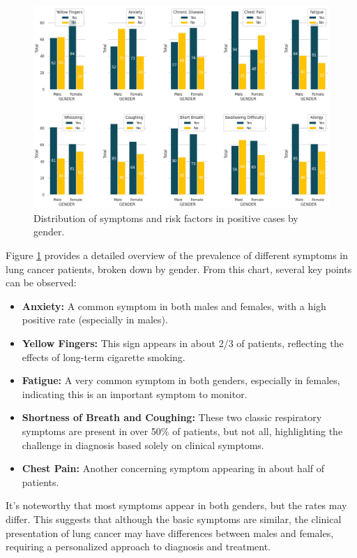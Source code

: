 \begin{figure}[H]
    \centering
    \includegraphics[width=\textwidth]{Images/symptoms.png}
    \caption{Distribution of symptoms and risk factors in positive cases by gender.}
    \label{fig:symptoms_dist}
\end{figure}

Figure \ref{fig:symptoms_dist} provides a detailed overview of the prevalence of different symptoms in lung cancer patients, broken down by gender. From this chart, several key points can be observed:

\begin{itemize}
    \item \textbf{Anxiety:} A common symptom in both males and females, with a high positive rate (especially in males).
    \item \textbf{Yellow Fingers:} This sign appears in about 2/3 of patients, reflecting the effects of long-term cigarette smoking.
    \item \textbf{Fatigue:} A very common symptom in both genders, especially in females, indicating this is an important symptom to monitor.
    \item \textbf{Shortness of Breath and Coughing:} These two classic respiratory symptoms are present in over 50\% of patients, but not all, highlighting the challenge in diagnosis based solely on clinical symptoms.
    \item \textbf{Chest Pain:} Another concerning symptom appearing in about half of patients.
\end{itemize}

It's noteworthy that most symptoms appear in both genders, but the rates may differ. This suggests that although the basic symptoms are similar, the clinical presentation of lung cancer may have differences between males and females, requiring a personalized approach to diagnosis and treatment.

